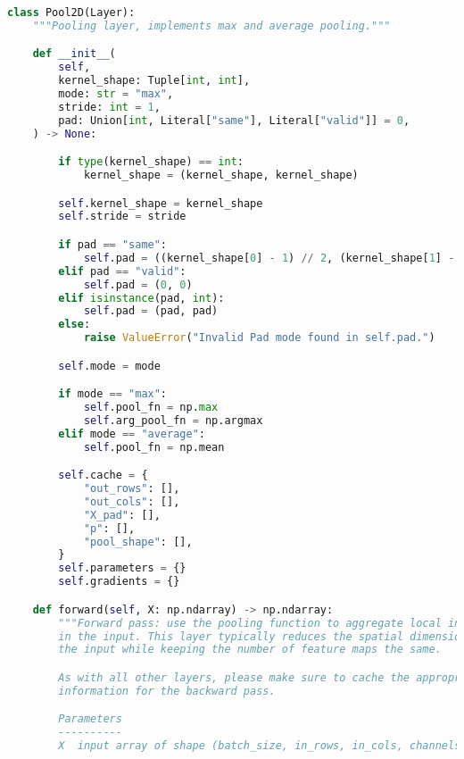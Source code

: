 \begin{lstlisting}[language=Python]
class Pool2D(Layer):
    """Pooling layer, implements max and average pooling."""

    def __init__(
        self,
        kernel_shape: Tuple[int, int],
        mode: str = "max",
        stride: int = 1,
        pad: Union[int, Literal["same"], Literal["valid"]] = 0,
    ) -> None:

        if type(kernel_shape) == int:
            kernel_shape = (kernel_shape, kernel_shape)

        self.kernel_shape = kernel_shape
        self.stride = stride

        if pad == "same":
            self.pad = ((kernel_shape[0] - 1) // 2, (kernel_shape[1] - 1) // 2)
        elif pad == "valid":
            self.pad = (0, 0)
        elif isinstance(pad, int):
            self.pad = (pad, pad)
        else:
            raise ValueError("Invalid Pad mode found in self.pad.")

        self.mode = mode

        if mode == "max":
            self.pool_fn = np.max
            self.arg_pool_fn = np.argmax
        elif mode == "average":
            self.pool_fn = np.mean

        self.cache = {
            "out_rows": [],
            "out_cols": [],
            "X_pad": [],
            "p": [],
            "pool_shape": [],
        }
        self.parameters = {}
        self.gradients = {}

    def forward(self, X: np.ndarray) -> np.ndarray:
        """Forward pass: use the pooling function to aggregate local information
        in the input. This layer typically reduces the spatial dimensionality of
        the input while keeping the number of feature maps the same.

        As with all other layers, please make sure to cache the appropriate
        information for the backward pass.

        Parameters
        ----------
        X  input array of shape (batch_size, in_rows, in_cols, channels)


\end{lstlisting}
